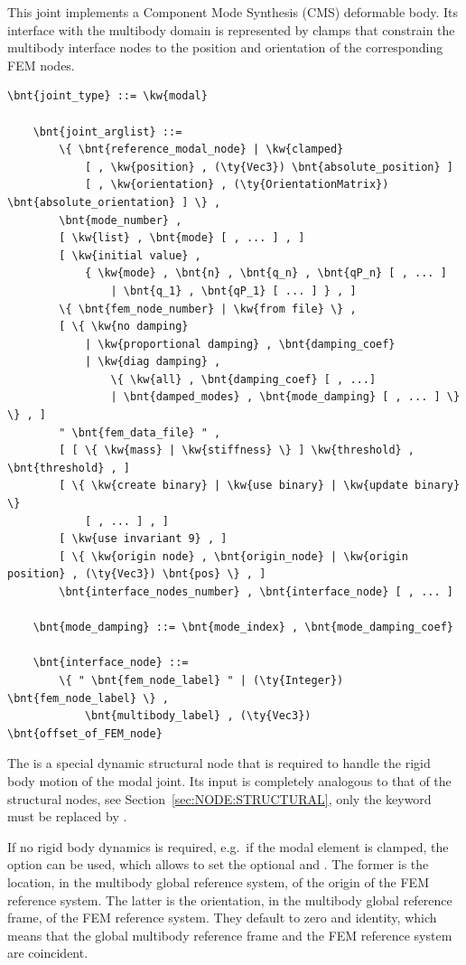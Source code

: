 This joint implements a Component Mode Synthesis (CMS) deformable body.
Its interface with the multibody domain is represented by clamps
that constrain the multibody interface nodes to the position
and orientation of the corresponding FEM nodes.
\begin{Verbatim}[commandchars=\\\{\}]
    \bnt{joint_type} ::= \kw{modal}

    \bnt{joint_arglist} ::=
        \{ \bnt{reference_modal_node} | \kw{clamped}
            [ , \kw{position} , (\ty{Vec3}) \bnt{absolute_position} ]
            [ , \kw{orientation} , (\ty{OrientationMatrix}) \bnt{absolute_orientation} ] \} ,
        \bnt{mode_number} ,
        [ \kw{list} , \bnt{mode} [ , ... ] , ]
        [ \kw{initial value} ,
            { \kw{mode} , \bnt{n} , \bnt{q_n} , \bnt{qP_n} [ , ... ]
                | \bnt{q_1} , \bnt{qP_1} [ ... ] } , ]
        \{ \bnt{fem_node_number} | \kw{from file} \} ,
        [ \{ \kw{no damping}
            | \kw{proportional damping} , \bnt{damping_coef}
            | \kw{diag damping} ,
                \{ \kw{all} , \bnt{damping_coef} [ , ...]
                | \bnt{damped_modes} , \bnt{mode_damping} [ , ... ] \} \} , ]
        " \bnt{fem_data_file} " ,
        [ [ \{ \kw{mass} | \kw{stiffness} \} ] \kw{threshold} , \bnt{threshold} , ]
        [ \{ \kw{create binary} | \kw{use binary} | \kw{update binary} \}
            [ , ... ] , ]
        [ \kw{use invariant 9} , ]
        [ \{ \kw{origin node} , \bnt{origin_node} | \kw{origin position} , (\ty{Vec3}) \bnt{pos} \} , ]
        \bnt{interface_nodes_number} , \bnt{interface_node} [ , ... ]

    \bnt{mode_damping} ::= \bnt{mode_index} , \bnt{mode_damping_coef}

    \bnt{interface_node} ::=
        \{ " \bnt{fem_node_label} " | (\ty{Integer}) \bnt{fem_node_label} \} ,
            \bnt{multibody_label} , (\ty{Vec3}) \bnt{offset_of_FEM_node}
\end{Verbatim}
The  is a special dynamic structural node 
that is required to handle the rigid body motion of the modal joint.
Its input is completely analogous to that of the  structural
nodes, see Section~\ref{sec:NODE:STRUCTURAL}, only the keyword  
must be replaced by .

If no rigid body dynamics is required, e.g.\ if the modal element
is clamped, the  option can be used, which allows
to set the optional 
and .
The former is the location, in the multibody
global reference system, of the origin of the FEM reference system.
The latter is the orientation,
in the multibody global reference frame,
of the FEM reference system.
They default to zero and identity, which means
that the global multibody reference frame
and the FEM reference system are coincident.

